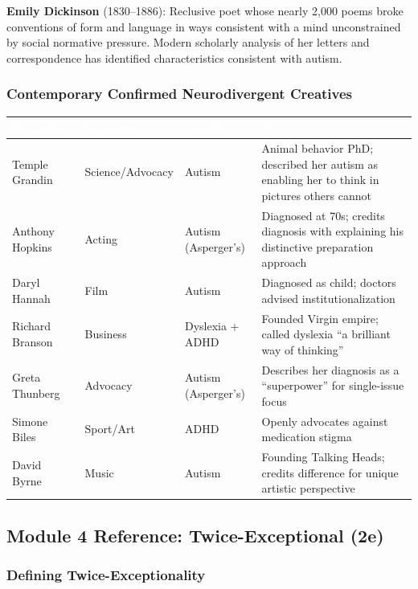 \documentclass[11pt,letterpaper]{article}
\newcommand{\tableheader}[1]{\textbf{\sffamily\textcolor{white}{#1}}}
\begin{document}
\textbf{Emily Dickinson} (1830--1886): Reclusive poet whose nearly 2,000 poems broke conventions of form and language in ways consistent with a mind unconstrained by social normative pressure. Modern scholarly analysis of her letters and correspondence has identified characteristics consistent with autism.

\subsubsection{Contemporary Confirmed Neurodivergent Creatives}

\begin{center}
\begin{tabularx}{\textwidth}{L{3cm}L{3cm}L{3cm}X}
\toprule
{}
\tableheader{Individual} & \tableheader{Domain} & \tableheader{Condition} & \tableheader{Notes} \\
\midrule
Temple Grandin & Science/Advocacy & Autism & Animal behavior PhD; described her autism as enabling her to think in pictures others cannot \\
Anthony Hopkins & Acting & Autism (Asperger's) & Diagnosed at 70s; credits diagnosis with explaining his distinctive preparation approach \\
Daryl Hannah & Film & Autism & Diagnosed as child; doctors advised institutionalization \\
Richard Branson & Business & Dyslexia + ADHD & Founded Virgin empire; called dyslexia ``a brilliant way of thinking'' \\
Greta Thunberg & Advocacy & Autism (Asperger's) & Describes her diagnosis as a ``superpower'' for single-issue focus \\
Simone Biles & Sport/Art & ADHD & Openly advocates against medication stigma \\
David Byrne & Music & Autism & Founding Talking Heads; credits difference for unique artistic perspective \\
\bottomrule
\end{tabularx}
\end{center}

\subsection{Module 4 Reference: Twice-Exceptional (2e)}

\subsubsection{Defining Twice-Exceptionality}
\end{document}
